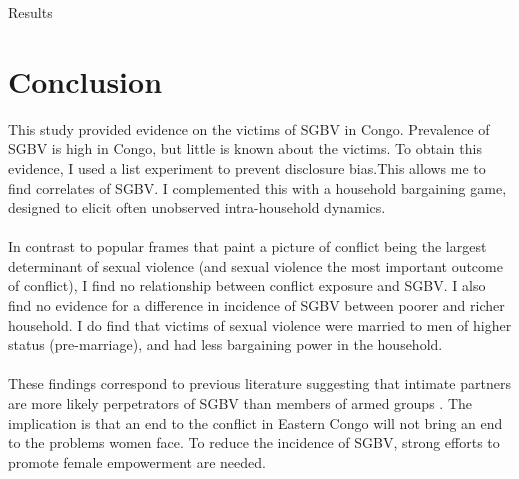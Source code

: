 \documentclass[11pt,a4paper]{scrartcl} %
\newcommand{\tableloc}{C:/Users/Koen/Dropbox/PhD/Papers/CongoGBV/Tables}
\begin{document}
\newcommand{\coeffget}[3]{\csvreader[filter=\equal{\reg}{#1} \and \equal{\var}{#2}]{\tableloc/regs.csv}{var=\var,reg=\reg,#3=\coeff}{\coeff}}

\begin{table}
	\caption{Results}\label{tab:results_regression}
	\begin{center}
	
	\end{center}
\end{table}


\section*{Conclusion}
This study provided evidence on the victims of SGBV in Congo. Prevalence of SGBV is high in Congo, but little is known about the victims. To obtain this evidence, I used a list experiment to prevent disclosure bias.This allows me to find correlates of SGBV. I complemented this with a household bargaining game, designed to elicit often unobserved intra-household dynamics.

\paragraph{} 
In contrast to popular frames that paint a picture of conflict being the largest determinant of sexual violence (and sexual violence the most important outcome of conflict), I find no relationship between conflict exposure and SGBV. I also find no evidence for a difference in incidence of SGBV between poorer and richer household. I do find that victims of sexual violence were married to men of higher status (pre-marriage), and had less bargaining power in the household.

\paragraph{} 
These findings correspond to previous literature suggesting that intimate partners are more likely perpetrators of SGBV than members of armed groups \citep[see e.g.][]{Peterman2011}. The implication is that an end to the conflict in Eastern Congo will not bring an end to the problems women face. To reduce the incidence of SGBV, strong efforts to promote female empowerment are needed.
\end{document}
